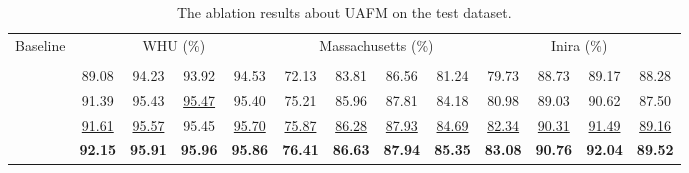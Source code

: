 \documentclass[lettersize,journal]{IEEEtran}
\begin{document}
\begin{table*}[]
\normalsize
\setlength\tabcolsep{3pt}
\caption{The ablation results about UAFM on the test dataset.}
\label{tab:table_UAFM}
\center
\begin{tabular}{c|cccc|cccc|cccc}
\hline
\multirow{2}{*}{Baseline} & \multicolumn{4}{c|}{WHU (\%)}&\multicolumn{4}{c|}{Massachusetts (\%)} &\multicolumn{4}{c}{Inira (\%)}                                             
 \\ \cline{2-13} 
 &  &  &  &  
 &  &  &  & 
 &  &  &  &  \\ \hline
&
89.08	&94.23	&93.92	&94.53	
&72.13	&83.81	&86.56	&81.24 
&79.73  &88.73  &89.17  &88.28\\
&
91.39 &95.43 &\underline{95.47} &95.40
&75.21 &85.96 &{87.81} &84.18 
&80.98 &89.03 &90.62 &87.50\\ 
 &
\underline{91.61} &\underline{95.57} &95.45 &\underline{95.70}
&\underline{75.87} &\underline{86.28} &\underline{87.93} &\underline{84.69}
&\underline{82.34} &\underline{90.31} &\underline{91.49} &\underline{89.16}\\  
 &
\color{red}\textbf{92.15} &{\color{red}\textbf{95.91}} &{\color{red}\textbf{95.96}} &\color{red}\textbf{95.86}

& \color{red}\textbf{{76.41}} &\color{red}\textbf{{86.63}} &\color{red}\textbf{87.94} &\color{red}\textbf{{85.35}}

& {\color{red}\textbf{83.08}} &{\color{red}\textbf{90.76}} &{\color{red}\textbf{92.04}} &{\color{red}\textbf{89.52}}
\\ \hline
\end{tabular}
\end{table*}
\end{document}
